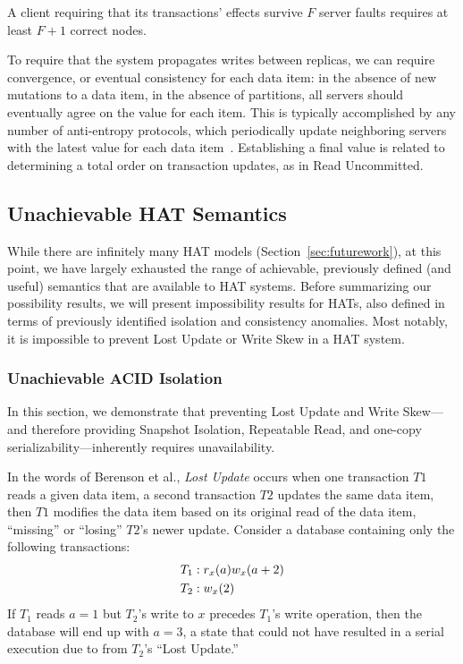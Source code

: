 \vspace{.5em} A client requiring that its
transactions' effects survive $F$ server faults requires at least
$F+1$ correct nodes.

\vspace{.5em} To require that the
system propagates writes between replicas, we can require convergence,
or eventual consistency for each data item: in the absence of new
mutations to a data item, in the absence of partitions, all servers
should eventually agree on the value for each item. This is typically
accomplished by any number of anti-entropy protocols, which
periodically update neighboring servers with the latest value for each
data item~\cite{antientropy}. Establishing a final value is related to
determining a total order on transaction updates, as in Read
Uncommitted.

\subsection{Unachievable HAT Semantics}
\label{sec:unachievable-hat}

While there are infinitely many HAT models
(Section~\ref{sec:futurework}), at this point, we have largely
exhausted the range of achievable, previously defined (and useful)
semantics that are available to HAT systems. Before summarizing our
possibility results, we will present impossibility results for HATs,
also defined in terms of previously identified isolation and
consistency anomalies. Most notably, it is impossible to
prevent Lost Update or Write Skew in a HAT system.

\subsubsection{Unachievable ACID Isolation}

In this section, we demonstrate that preventing Lost Update and Write
Skew---and therefore providing Snapshot Isolation, Repeatable Read,
and one-copy serializability---inherently requires unavailability.

In the words of Berenson et al., \textit{Lost Update} occurs when one
transaction $T1$ reads a given data item, a second transaction $T2$
updates the same data item, then $T1$ modifies the data item based on
its original read of the data item, ``missing'' or ``losing'' $T2$'s
newer update. Consider a database containing only the following
transactions:
\begin{align*}
\small
T_1 &: r_x(a) w_x(a+2)
\\T_2 &: w_x(2)
\end{align*}
If $T_1$ reads $a=1$ but $T_2$'s write to $x$ precedes $T_1$'s write
operation, then the database will end up with $a=3$, a state that
could not have resulted in a serial execution due to from $T_2$'s
``Lost Update.''

